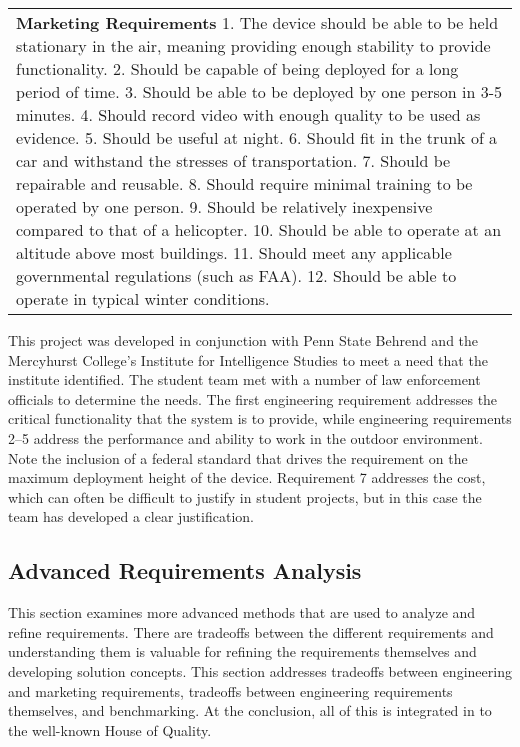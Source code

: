 \begin{table}
\begin{tabular}{ |c|l|l|}
\multicolumn{3}{l}{
\textbf{Marketing Requirements}
1.  The device should be able to be held stationary in the air, meaning
  providing enough stability to provide functionality.
2.  Should be capable of being deployed for a long period of time.
3.   Should be able to be deployed by one person in 3-5 minutes.
4.  Should record video with enough quality to be used as evidence.
5.  Should be useful at night.
6.  Should fit in the trunk of a car and withstand the stresses of
  transportation.
7.  Should be repairable and reusable.
8.  Should require minimal training to be operated by one person.
9.  Should be relatively inexpensive compared to that of a helicopter.
10.  Should be able to operate at an altitude above most buildings.
11.  Should meet any applicable governmental regulations (such as FAA).
12.  Should be able to operate in typical winter conditions.}
\end{tabular}
\end{table}

This project was developed in conjunction with Penn State Behrend and
the Mercyhurst College's Institute for Intelligence Studies to meet a
need that the institute identified. The student team met with a number
of law enforcement officials to determine the needs. The first
engineering requirement addresses the critical functionality that the
system is to provide, while engineering requirements 2--5 address the
performance and ability to work in the outdoor environment. Note the
inclusion of a federal standard that drives the requirement on the
maximum deployment height of the device. Requirement 7 addresses the
cost, which can often be difficult to justify in student projects, but
in this case the team has developed a clear justification.

\subsection{Advanced Requirements
Analysis}\label{advanced-requirements-analysis}

This section examines more advanced methods that are used to analyze and
refine requirements. There are tradeoffs between the different
requirements and understanding them is valuable for refining the
requirements themselves and developing solution concepts. This section
addresses tradeoffs between engineering and marketing requirements,
tradeoffs between engineering requirements themselves, and benchmarking.
At the conclusion, all of this is integrated in to the well-known House
of Quality.

